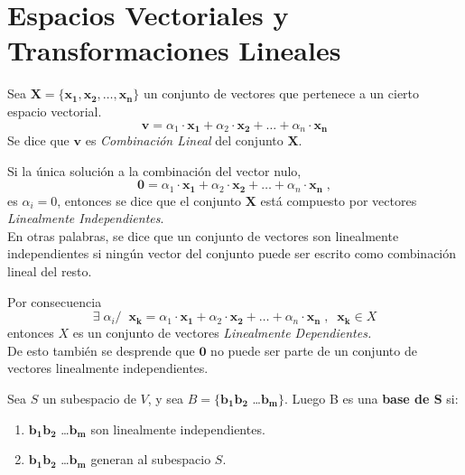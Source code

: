 \section{Espacios Vectoriales y Transformaciones Lineales}
\begin{definition}
    Sea $ \bm{X} = \{ \bm{x_1, x_2} ,\dots, \bm{x_n} \}$ un conjunto de 
    vectores que pertenece a un cierto espacio vectorial.
    \begin{equation*}
        \bm{v} = \alpha_1 \cdot \bm{x_1} + \alpha_2 \cdot \bm{x_2} + \dots + \alpha_n \cdot \bm{x_n}    
    \end{equation*}
    Se dice que $\bm{v}$ es \textit{Combinación Lineal} del conjunto $\bm{X}$.
\end{definition}
\begin{definition}
    Si la única solución a la combinación del vector nulo,
    \begin{equation*}
        \bm{0} = \alpha_1 \cdot \bm{x_1} + \alpha_2 \cdot \bm{x_2} + \dots + \alpha_n \cdot \bm{x_n} \;,
    \end{equation*}
    es $\alpha_i = 0$, entonces se dice que el conjunto $\bm{X}$ está compuesto
    por vectores \textit{Linealmente Independientes}.\\
    En otras palabras, se dice que un conjunto de vectores son linealmente independientes si ningún vector del conjunto
    puede ser escrito como combinación lineal del resto.
\end{definition}
\begin{obs}
    Por consecuencia
    \begin{equation*}
       \exists \; \alpha_i / \;\; \bm{x_k} = \alpha_1 \cdot \bm{x_1} + \alpha_2 \cdot \bm{x_2} + \dots + \alpha_n \cdot \bm{x_n}\; , \;\; \bm{x_k} \in X   
    \end{equation*}
    entonces $X$ es un conjunto de vectores \textit{Linealmente Dependientes.}\\
    De esto también se desprende que $\bm{0}$ no puede ser parte de un conjunto
    de vectores linealmente independientes.
\end{obs} 

\begin{definition}
    Sea $S$ un subespacio de $V$, y sea $B = \{ \bm{b_1 b_2} $ \dots $\bm{b_m} \}$.
    Luego B es una \textbf{base de S} si:
    \begin{enumerate}
        \item $\bm{b_1 b_2}$ \dots $\bm{b_m}$ son linealmente independientes.
        \item $\bm{b_1 b_2}$ \dots $\bm{b_m}$ generan al subespacio $S$.
    \end{enumerate}
\end{definition}


